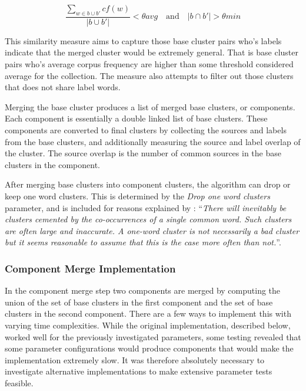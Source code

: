 \begin{displaymath}
\frac{\sum\limits_{w \in b \cup b'} cf(w)}{\vert b \cup b' \vert} < \theta avg \quad \text{and} \quad \vert b \cap b' \vert > \theta min
\end{displaymath}

This similarity measure aims to capture those base cluster pairs who's labels indicate that the merged cluster would be extremely general. That is base cluster pairs who's average corpus frequency are higher than some threshold considered average for the collection. The measure also attempts to filter out those clusters that does not share label words.

Merging the base cluster produces a list of merged base clusters, or components. Each component is essentially a double linked list of base clusters. These components are converted to final clusters by collecting the sources and labels from the base clusters, and additionally measuring the source and label overlap of the cluster. The source overlap is the number of common sources in the base clusters in the component.

After merging base clusters into component clusters, the algorithm can drop or keep one word clusters. This is determined by the \emph{Drop one word clusters} parameter, and is included for reasons explained by \cite[][664]{Moe2014}: ``\textit{There will inevitably be clusters cemented by the co-occurrences of a single common word. Such clusters are often large and inaccurate. A one-word cluster is not necessarily a bad cluster but it seems reasonable to assume that this is the case more often than not.}''.

\subsubsection{Component Merge Implementation}
\label{subsubsec:componentmerge}
In the component merge step two components are merged by computing the union of the set of base clusters in the first component and the set of base clusters in the second component. There are a few ways to implement this with varying time complexities. While the original implementation, described below, worked well for the previously investigated parameters, some testing revealed that some parameter configurations would produce components that would make the implementation extremely slow. It was therefore absolutely necessary to investigate alternative implementations to make extensive parameter tests feasible.

